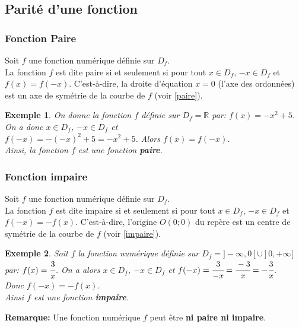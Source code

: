 \documentclass[a4paper, 12pt]{report}
\newtheorem{exemple}{Exemple}[section]
\begin{document}
            \subsection{Parité d'une fonction}
                \subsubsection{Fonction Paire}
                Soit $f$ une fonction numérique définie sur $D_f$.\\ 
                La fonction $f$ est dite paire si et seulement si pour tout $x\in D_f$, $-x\in D_f$ et \\ 
                $f(x)=f(-x)$. C'est-à-dire, la droite d'équation $x=0$ (l'axe des ordonnées) est un axe de symétrie de la courbe de $f$ (voir \ref{paire}).
                \begin{exemple}
                    On donne la fonction $f$ définie sur $D_f=\mathbb{R}$ par: $f(x)=-x^2+5$. On a donc $x\in D_f$, $-x\in D_f$ et \\ 
                    $f(-x)=-(-x)^2+5=-x^2+5$. Alors $f(x)=f(-x)$. \\ 
                    Ainsi, la fonction $f$ est une fonction \textbf{paire}. 
                \end{exemple}
                \subsubsection{Fonction impaire}
                Soit $f$ une fonction numérique définie sur $D_f$.\\ 
                La fonction $f$ est dite impaire si et seulement si pour tout $x\in D_f$, $-x\in D_f$ et \\ 
                $f(-x)=-f(x)$. C'est-à-dire, l'origine $O(0;0)$ du repère est un centre de symétrie de la courbe de $f$ (voir \ref{impaire}).
                \begin{exemple}
                    Soit $f$ la fonction numérique définie sur $D_f=]-\infty,0[ \cup ]0,+\infty[$ par: $f(x)=\cfrac{3}{x}$. 
                    On a alors $x\in D_f$, $-x\in D_f$ et $f(-x)=\cfrac{3}{-x}=\cfrac{-3}{x}=-\cfrac{3}{x}$.\\ 
                    Donc $f(-x)=-f(x)$.\\ 
                    Ainsi $f$ est une fonction \textbf{impaire}.
                \end{exemple}
                
                \textbf{Remarque: } Une fonction numérique $f$ peut être\textbf{ ni paire ni impaire}.
\end{document}
